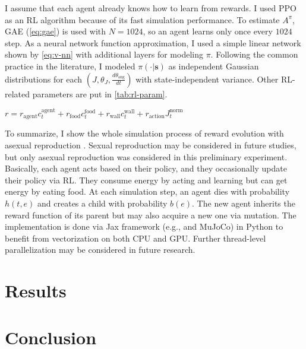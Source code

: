 I assume that each agent already knows how to learn from rewards. I used PPO\citep{schulmanProximalPolicyOptimization2017} as an RL algorithm because of its fast simulation performance. To estimate $A^{\pi}$, GAE (\cref{eq:gae}) is used with $N=1024$, so an agent learns only once every $1024$ step. As a neural network function approximation, I used a simple linear network shown by \cref{eq:v-nn} with additional layers for modeling $\pi$. Following the common practice in the literature, I modeled $\pi(\cdot|\textbf{s})$ as independent Gaussian distributions for each $ (J, \theta_{J}, \frac{d\theta_{\textrm{ang}}}{dt}) $ with state-independent variance. Other RL-related parameters are put in \cref{tab:rl-param}.

$r = r_{\textrm{agent}}c_{t}^{\textrm{agent}} + r_{\textrm{food}}c_{t}^{\textrm{food}} + r_{\textrm{wall}}c_{t}^{\textrm{wall}} + r_{\textrm{action}}J_{t}^{\textrm{norm}}$


To summarize, I show the whole simulation process of reward evolution with asexual reproduction . Sexual reproduction may be considered in future studies, but only asexual reproduction was considered in this preliminary experiment. Basically, each agent acts based on their policy, and they occasionally update their policy via RL. They consume energy by acting and learning but can get energy by eating food. At each simulation step, an agent dies with probability $h(t, e)$ and creates a child with probability $b(e)$. The new agent inherits the reward function of its parent but may also acquire a new one via mutation. The implementation is done via Jax framework (e.g., \citet{jax2018github} and MuJoCo) in Python to benefit from vectorization on both CPU and GPU. Further thread-level parallelization may be considered in future research.

\section{Results}

\section{Conclusion}